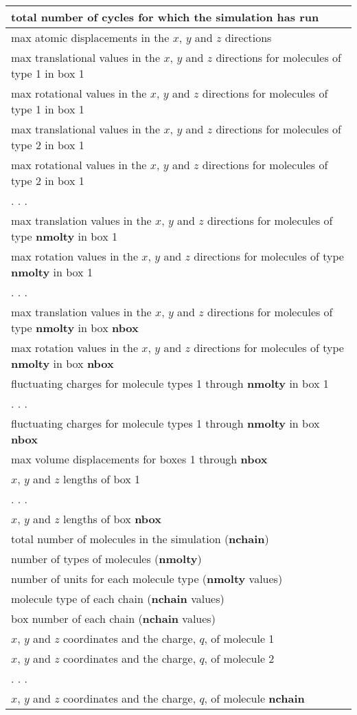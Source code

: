 \documentclass[12pt,letterpaper]{article}
\begin{document}
\begin{center}
\begin{tabular}{| l |}
\hline
total number of cycles for which the simulation has run \\ \hline
max atomic displacements in the $x$, $y$ and $z$ directions  \\ \hline
max translational values in the $x$, $y$ and $z$ directions for molecules of type 1 in box 1 \\ \hline
max rotational values in the $x$, $y$ and $z$ directions for molecules of type 1 in box 1 \\ \hline
max translational values in the $x$, $y$ and $z$ directions for molecules of type 2 in box 1 \\ \hline
max rotational values in the $x$, $y$ and $z$ directions for molecules of type 2 in box 1 \\ \hline
  . . . \\ \hline
max translation values in the $x$, $y$ and $z$ directions for molecules of type {\bf nmolty} in box 1 \\ \hline
max rotation values in the $x$, $y$ and $z$ directions for molecules of type {\bf nmolty} in box 1 \\ \hline
  . . . \\ \hline
max translation values in the $x$, $y$ and $z$ directions for molecules of type {\bf nmolty} in box {\bf nbox} \\ \hline
max rotation values in the $x$, $y$ and $z$ directions for molecules of type {\bf nmolty} in box {\bf nbox} \\ \hline
fluctuating charges for molecule types 1 through {\bf nmolty} in box 1 \\ \hline
  . . . \\ \hline
fluctuating charges for molecule types 1 through {\bf nmolty} in box {\bf nbox} \\ \hline
max volume displacements for boxes 1 through {\bf nbox} \\ \hline
$x$, $y$ and $z$ lengths of box 1  \\ \hline
  . . . \\ \hline
$x$, $y$ and $z$ lengths of box {\bf nbox} \\ \hline
total number of molecules in the simulation ({\bf nchain}) \\ \hline
number of types of molecules ({\bf nmolty}) \\ \hline
number of units for each molecule type ({\bf nmolty} values) \\ \hline
molecule type of each chain ({\bf nchain} values) \\ \hline
box number of each chain ({\bf nchain} values) \\ \hline
$x$, $y$ and $z$ coordinates and the charge, $q$, of molecule 1 \\ \hline
$x$, $y$ and $z$ coordinates and the charge, $q$, of molecule 2 \\ \hline
  . . . \\ \hline
$x$, $y$ and $z$ coordinates and the charge, $q$, of molecule {\bf nchain} \\
  \hline
\end{tabular}
\end{center}
\end{document}
